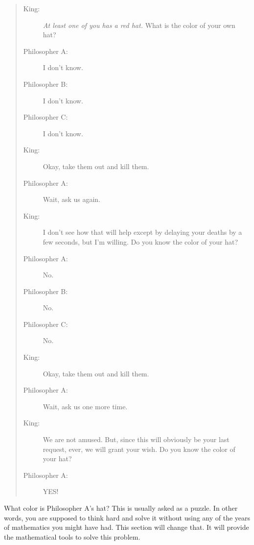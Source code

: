 \documentclass[14pt]{extarticle}
\begin{document}
\begin{quote}
  \begin{description}
  \item[King:] {\it At least one of you has a red hat.}  What is the color
    of your own hat?
  \item[Philosopher A:] I don't know.
  \item[Philosopher B:] I don't know.
  \item[Philosopher C:] I don't know.
  \item[King:] Okay, take them out and kill them.
  \item[Philosopher A:] Wait, ask us again.
  \item[King:] I don't see how that will help except by delaying your
    deaths by a few seconds, but I'm willing.  Do you know the color of
    your hat?
  \item[Philosopher A:] No.
  \item[Philosopher B:] No.
  \item[Philosopher C:] No.
  \item[King:] Okay, take them out and kill them.
  \item[Philosopher A:] Wait, ask us one more time.
  \item[King:] We are not amused. But, since this will obviously be
    your last request, ever, we will grant your wish.  Do you know the
    color of your hat?
  \item[Philosopher A:] YES!  
  \end{description}
\end{quote}


What color is Philosopher A's hat?  This is usually asked as a puzzle.
In other words, you are supposed to think hard and solve it without
using any of the years of mathematics you might have had.  This
section will change that.  It will provide the mathematical tools to
solve this problem.
\end{document}
